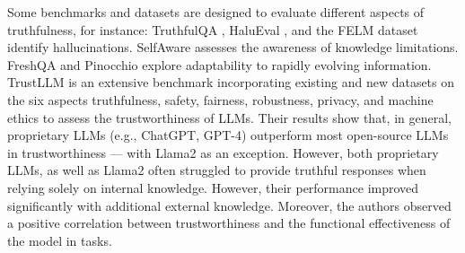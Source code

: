 Some benchmarks and datasets are designed to evaluate different aspects of truthfulness, for instance: TruthfulQA \cite{lin2021truthfulqa}, HaluEval \cite{li2023halueval}, and the FELM dataset \cite{zhao2024felm} identify hallucinations. SelfAware \cite{yin2023large} assesses the awareness of knowledge limitations. FreshQA \cite{vu2023freshllms} and Pinocchio \cite{yin2023large} explore adaptability to rapidly evolving information. 
TrustLLM \cite{sun2024trustllm} is an extensive benchmark  incorporating existing and new datasets on the six aspects truthfulness, safety, fairness, robustness, privacy, and machine ethics to assess the trustworthiness of LLMs. Their results show that, in general, proprietary LLMs (e.g., ChatGPT, GPT-4) outperform most open-source LLMs in trustworthiness --- with %
Llama2 \cite{touvron2023llama} as an exception. %
However, both proprietary LLMs, as well as Llama2 often struggled to provide truthful responses when relying solely on internal knowledge. However, their performance improved significantly with additional external knowledge. Moreover, the authors observed a positive correlation between trustworthiness and the functional effectiveness of the model in %
tasks. %

